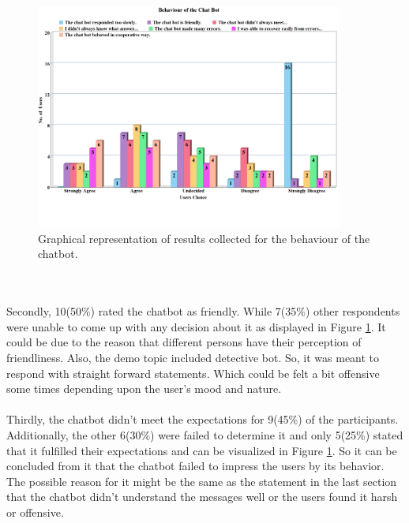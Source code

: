 \begin{figure}[!h]
    \centering
    \includegraphics[width=0.9\textwidth]{img/Behaviour_of_the_Chat_Bot_Updated_2.png}
    \caption{Graphical representation of results collected for the behaviour of the chatbot.}
    \label{fig:behavofBot}
\end{figure}
\\~\\
Secondly, 10(50\%) rated the chatbot as friendly. While 7(35\%) other respondents were unable to come up with any decision about it as displayed in Figure \ref{fig:behavofBot}. It could be due to the reason that different persons have their perception of friendliness. Also, the demo topic included detective bot. So, it was meant to respond with straight forward statements. Which could be felt a bit offensive some times depending upon the user's mood and nature. 
\\~\\
Thirdly, the chatbot didn't meet the expectations for 9(45\%) of the participants. Additionally, the other 6(30\%) were failed to determine it and only 5(25\%) stated that it fulfilled their expectations and can be visualized in Figure \ref{fig:behavofBot}. So it can be concluded from it that the chatbot failed to impress the users by its behavior. The possible reason for it might be the same as the statement in the last section that the chatbot didn't understand the messages well or the users found it harsh or offensive.
